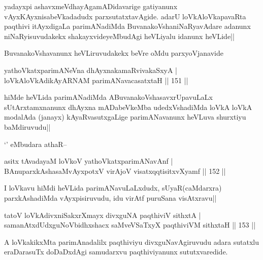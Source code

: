 \begin{artha}
yadayxpi ashavxmeVdhayAgamADidavarige gatiyanunx vAyxKAyxnisabeVkadadudx parxsutatxtavAgide. adarU loVkAloVkapavaRta paqthivi itAyxdigaLa parimANadiMda BuvanakoVshaniNaRyavAdare adanunx niNaRyisuvudakekx shakayxvideyeMbudAgi heVLiyalu idanunx heVLide||
\end{artha}

\begin{artha}
BuvanakoVshavanunx heVLiruvudakekx beVre oMdu parxyoVjanavide
\end{artha}

\begin{shl}
yathoVkatxparimANeVna dhAyxnakamaRvivakaSxyA |\\
loVkAloVkAdikAyARNAM parimANavacasatxtaH \hfill || 151 ||
\end{shl}

\begin{artha}
hiMde heVLida parimANadiMda ABuvanakoVshasavxrUpavuLaLx sUtArxtamxnanunx dhAyxna mADabeVkeMba udedxVshadiMda loVkA loVkA modalAda (janayx) kAyaRvasutxgaLige parimANavanunx heVLuva shurxtiyu baMdiruvudu||
\end{artha}

\begin{artha}
`\stext' eMbudara athaR--
\end{artha}

\begin{shl}
asitx tAvadayaM loVkoV yathoVkatxparimANavAnf |\\
BAnuparxkAshasaMvAyxpotxV virAjoV visatxqqtisitxvXyamf \hfill || 152 ||
\end{shl}

\begin{artha}
I loVkavu hiMdi heVLida parimANavuLaLxdudx, sUyaR(caMdarxra) parxkAshadiMda vAyxpisiruvudu, idu virAtf puruSana visAtxravu||
\end{artha}

\begin{shl}
tatoV loVkAdivxniSakxrXmayx divxguNA paqthiviV sithxtA |\\
samanAtxdUdxguNoV\s bidhxshacx saMveVSaTxyX paqthiviVM sithxtaH \hfill || 153 ||
\end{shl}

\begin{artha}
A loVkakikxMta parimAnadalilx paqthiviyu divxguNavAgiruvudu adara sutatxlu eraDarasuTx doDaDxdAgi samudarxvu paqthiviyanunx sututxvaredide.
\end{artha}

